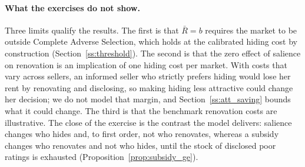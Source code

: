 \paragraph{What the exercises do not show.}
Three limits qualify the results. The first is that $\bar R=b$ requires the market to be outside Complete Adverse Selection, which holds at the calibrated hiding cost by construction (Section~\ref{ss:threshold}). The second is that the zero effect of salience on renovation is an implication of one hiding cost per market. With costs that vary across sellers, an informed seller who strictly prefers hiding would lose her rent by renovating and disclosing, so making hiding less attractive could change her decision; we do not model that margin, and Section~\ref{ss:att_saving} bounds what it could change. The third is that the benchmark renovation costs are illustrative. The close of the exercise is the contrast the model delivers: salience changes who hides and, to first order, not who renovates, whereas a subsidy changes who renovates and not who hides, until the stock of disclosed poor ratings is exhausted (Proposition~\ref{prop:subsidy_ge}).
